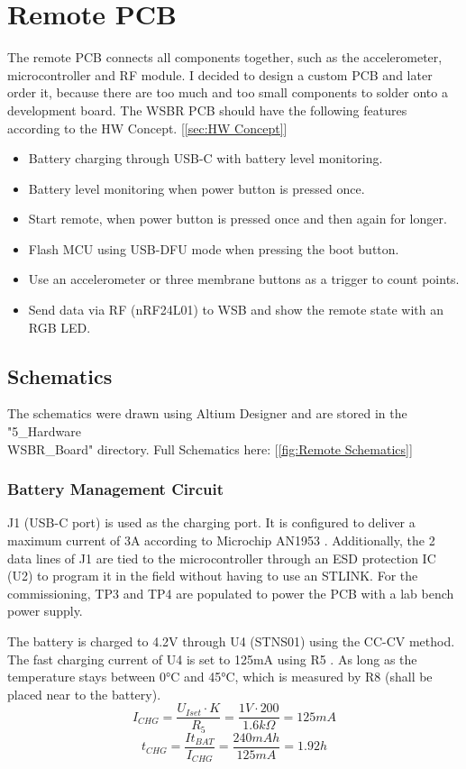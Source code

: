 \section{Remote PCB}
\label{sec:Remote PCB}
The remote PCB connects all components together, such as the accelerometer, microcontroller and RF module. I decided to design a custom PCB and later order it, because there are too much and too small components to solder onto a development board. The WSBR PCB should have the following features according to the HW Concept. [\ref{sec:HW Concept}]

\begin{itemize}
    \item Battery charging through USB-C with battery level monitoring.
    \item Battery level monitoring when power button is pressed once.
    \item Start remote, when power button is pressed once and then again for longer.
    \item Flash MCU using USB-DFU mode when pressing the boot button.
    \item Use an accelerometer or three membrane buttons as a trigger to count points.
    \item Send data via RF (nRF24L01) to WSB and show the remote state with an RGB LED.
\end{itemize}


\subsection{Schematics}
The schematics were drawn using Altium Designer and are stored in the "5\_Hardware\\WSBR\_Board" directory. Full Schematics here: [\ref{fig:Remote Schematics}]

\label{ssec:Schematics}

\subsubsection{Battery Management Circuit}
J1 (USB-C port) is used as the charging port. It is configured to deliver a maximum current of 3A according to Microchip AN1953 \cite{AN1953}. Additionally, the 2 data lines of J1 are tied to the microcontroller through an ESD protection IC (U2) to program it in the field without having to use an STLINK. For the commissioning, TP3 and TP4 are populated to power the PCB with a lab bench power supply.

The battery is charged to 4.2V through U4 (STNS01) using the CC-CV method. The fast charging current of U4 is set to 125mA using R5 \cite{DS_STNS01}. As long as the temperature stays between 0°C and 45°C, which is measured by R8 (shall be placed near to the battery).
$$I_{CHG}=\frac{U_{Iset} \cdot K}{R_5}=\frac{1V \cdot 200}{1.6k\Omega}=125mA$$
$$t_{CHG}=\frac{It_{BAT}}{I_{CHG}}=\frac{240mAh}{125mA}=1.92h$$


